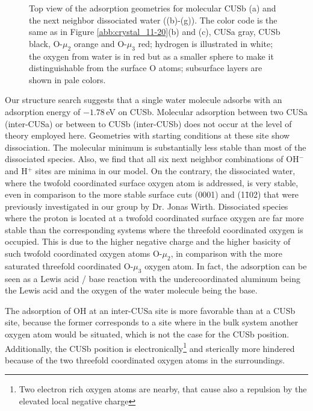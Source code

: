 \documentclass[11pt,DIV=13,BCOR=5mm,a4paper,headinclude]{scrbook}
\begin{document}
\begin{figure}[!ht]
 \caption{Top view of the adsorption geometries for molecular CUSb (a) and the next neighbor dissociated water 
((b)-(g)).
The color code is the same as in Figure \ref{abb:crystal_11-20}(b) and (c), CUSa gray, CUSb black, O-$\mu_2$ orange and O-$\mu_3$ red; hydrogen is illustrated in white; the oxygen from water is in red but as a smaller sphere to make it distinguishable from the surface O atoms; subsurface layers are shown in pale colors.}
        \label{abb:ads-geoms}
 \end{figure}

Our structure search suggests that a single water molecule adsorbs with an adsorption energy of $-1.78\,$eV on CUSb.
Molecular adsorption between two CUSa (inter-CUSa) or between to CUSb (inter-CUSb) does not occur at the level of theory employed here.
Geometries with starting conditions at these site show dissociation.
The molecular minimum is substantially less stable than most of the dissociated species.
Also, we find that all six next neighbor combinations of OH$^-$ and H$^+$ sites are minima in our model.
On the contrary, the dissociated water, where the twofold coordinated surface oxygen atom is addressed, is very stable, even in comparison to the more stable surface cuts (0001) and (1\=102) that were previously investigated in our group by Dr. Jonas Wirth\cite{Wirth2016,WirthJPCC2012}.
Dissociated species where the proton is located at a twofold coordinated surface oxygen are far more stable than the corresponding systems where the threefold coordinated oxygen is occupied.
This is due to the higher negative charge and the higher basicity of such twofold coordinated oxygen atoms O-$\mu_2$, in comparison with the more saturated threefold coordinated O-$\mu_3$ oxygen atom.
In fact, the adsorption can be seen as a Lewis acid / base reaction\cite{Stair1981} with the undercoordinated aluminum being the Lewis acid and the oxygen of the water molecule being the base.


The adsorption of OH at an inter-CUSa site is more favorable than at a CUSb site, because the former corresponds to a site where in the bulk system another oxygen atom would be situated, which is not the case for the CUSb position.
Additionally, the CUSb position is electronically\footnote{Two electron rich oxygen atoms are nearby, that cause also a repulsion by the elevated local negative charge} and sterically more hindered because of the two threefold coordinated oxygen atoms in the surroundings.
\end{document}
